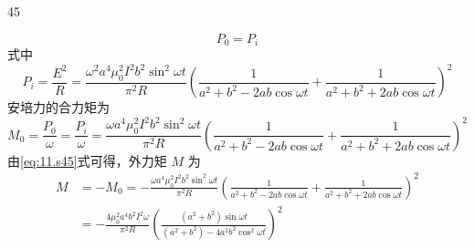 \begin{solution}{45}
\begin{subsolution}
\begin{equation}
            P_{0} = P_{i}
            \label{eq:12.s45}
        \end{equation}
        式中
        \begin{equation}
            P_{i} = \frac{E^{2}}{R} = \frac{\omega^{2} a^{4} \mu_{0}^{2} I^{2} b^{2} \sin^{2}\omega t}{\pi^{2} R} \left(\frac{1}{a^{2} + b^{2} - 2ab\cos\omega t} + \frac{1}{a^{2} + b^{2} + 2ab\cos\omega t}\right)^{2}
            \label{eq:13.s45}
        \end{equation}
        安培力的合力矩为
        \begin{equation}
            M_{0} = \frac{P_{0}}{\omega} = \frac{P_{i}}{\omega} = \frac{\omega a^{4} \mu_{0}^{2} I^{2} b^{2} \sin^{2}\omega t}{\pi^{2} R} \left(\frac{1}{a^{2} + b^{2} - 2ab\cos\omega t} + \frac{1}{a^{2} + b^{2} + 2ab\cos\omega t}\right)^{2}
            \label{eq:14.s45}
        \end{equation}
        由\eqref{eq:11.s45}式可得，外力矩 $M$ 为
        \begin{equation}
            \begin{aligned}
                M &= -M_{0} = -\frac{\omega a^{4} \mu_{0}^{2} I^{2} b^{2} \sin^{2}\omega t}{\pi^{2} R} \left(\frac{1}{a^{2} + b^{2} - 2ab\cos\omega t} + \frac{1}{a^{2} + b^{2} + 2ab\cos\omega t}\right)^{2} \\
                &= -\frac{4\mu_{0}^{2} a^{4} b^{2} I^{2} \omega}{\pi^{2} R} \left(\frac{(a^{2} + b^{2})\sin\omega t}{(a^{2} + b^{2}) - 4a^{2}b^{2}\cos^{2}\omega t}\right)^{2}
            \end{aligned}
            \label{eq:15.s45}
        \end{equation}
    \end{subsolution}
\end{solution}